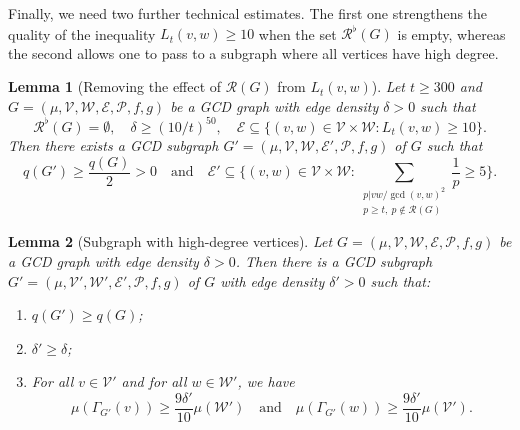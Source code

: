 \documentclass[12pt]{amsart}
\numberwithin{equation}{section}
\newtheorem{lem}{Lemma}[section]
\theoremstyle{definition}
\theoremstyle{remark}
\newcommand{\CE}{\mathcal{E}}
\newcommand{\CP}{\mathcal{P}}
\newcommand{\CR}{\mathcal{R}}
\newcommand{\CV}{\mathcal{V}}
\newcommand{\CW}{\mathcal{W}}
\renewcommand{\ge}{\geqslant}
\begin{document}
Finally, we need two further technical estimates. The first one strengthens the quality of the inequality $L_t(v,w)\ge10$ when the set $\CR^\flat(G)$ is empty, whereas the second allows one to pass to a subgraph where all vertices have high degree.


\begin{lem}[Removing the effect of $\CR(G)$ from $L_t(v,w)$]\label{lem:Cosmetic}
	Let $t\ge300$ and $G=(\mu,\CV,\CW,\CE,\CP,f,g)$ be a GCD graph with edge density $\delta>0$ such that
	\[
	\CR^\flat(G)=\emptyset,
	\quad 
	\delta\ge (10/t)^{50},
	\quad
	\CE\subseteq\{(v,w)\in\CV\times\CW: L_t(v,w)\ge 10\}.
	\]
	Then there exists a GCD subgraph $G'=(\mu,\CV,\CW,\CE',\CP,f,g)$ of $G$ such that
	\[
	q(G')\ge \frac{q(G)}{2}>0\quad\text{and}\quad
	\CE'\subseteq \bigg\{(v,w)\in\CV\times\CW:
	\sum_{\substack{p|v w/\gcd(v,w)^2\\p\ge t,\ p\notin \CR(G)}}\frac{1}{p}\ge 5\bigg\}.
	\]
\end{lem}

\begin{lem}[Subgraph with high-degree vertices]\label{lem:HighDegreeSubgraph}
Let $G=(\mu,\CV,\CW,\CE,\CP,f,g)$ be a GCD graph with edge density $\delta>0$. Then there is a GCD subgraph $G'=(\mu,\CV',\CW',\CE',\CP,f,g)$ of $G$ with edge density $\delta'>0$ such that:
\begin{enumerate}
\item $q(G')\ge q(G)$;
\item $\delta'\ge \delta$;
\item For all $v\in\CV'$ and for all $w\in\CW'$, we have
\[
\mu(\Gamma_{G'}(v))\ge\frac{9\delta'}{10}\mu(\CW')
\quad\text{and}\quad \mu(\Gamma_{G'}(w))\ge\frac{9\delta'}{10}\mu(\CV').
\]
\end{enumerate}

\end{lem}
\end{document}
